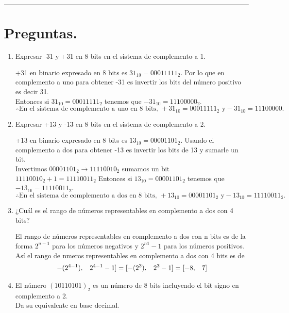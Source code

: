\documentclass[12pt,letterpaper]{article}
\newcommand{\imp}{\rightarrow}
\begin{document}
\bigskip
\hrule height 0.1pt
\bigskip

\section*{Preguntas.}

\begin{enumerate}
\item Expresar -31 y +31 en 8 bits en el sistema de complemento a 1.
  \bigskip

  +31 en binario expresado en 8 bits es $31_{10} = 00011111_2$. Por lo que en complemento a uno para obtener -31 es invertir los bits del n\'{u}mero positivo es decir 31.\\
  Entonces si $31_{10} = 00011111_2$ tenemos que $-31_{10} = 11100000_2$.
  \[
  \therefore \text{En el sistema de complemento a uno en 8 bits, } +31_{10} = 00011111_2 \text{ y} -31_{10} = 11100000.
  \]
  
\item Expresar +13 y -13 en 8 bits en el sistema de complemento a 2.
  \bigskip

  +13 en binario expresado en 8 bits es $13_{10} = 00001101_2$. Usando el complemento a dos para obtener -13 es invertir los bits de 13 y sumarle un bit.\\
  Invertimos $00001101_2 \imp 11110010_2$ sumamos un bit $11110010_2 + 1 = 11110011_2$
  Entonces si $13_{10} = 00001101_2$ tenemos que $-13_{10} = 11110011_2$.
  \[
  \therefore \text{En el sistema de complemento a dos en 8 bits, } +13_{10} = 00001101_2 \text{ y} -13_{10} = 11110011_2.
  \]
  
\item ¿Cuál es el rango de números representables en complemento a dos con 4 bits?
  \bigskip

  El rango de números representables en complemento a dos con n bits es de la forma $2^{n-1}$ para los números negativos y $2^{n1} - 1$ para los números positivos.\\
  Así el rango  de nmeros representables en complemento a dos con 4 bits es de
  \[
  -(2^{4-1}),\hspace{3mm} 2^{4-1} - 1] = [-(2^3),\hspace{3mm} 2^{3} - 1] = [-8,\hspace{3mm} 7]
    \]

  \item El número $(10110101)_2$ es un número de 8 bits incluyendo el bit signo en complemento a 2.\\
    Da su equivalente en base decimal.
    \bigskip


\end{enumerate}
\end{document}

